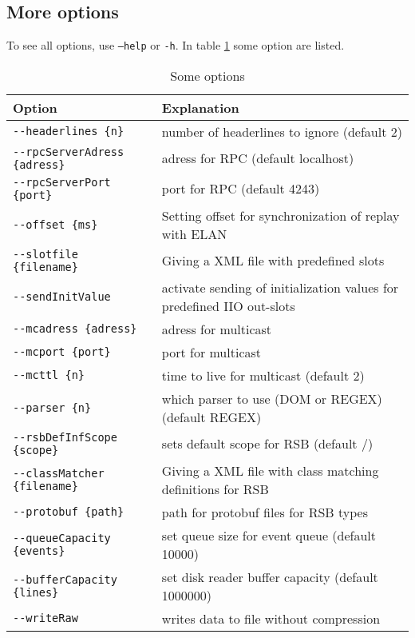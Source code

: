 \documentclass[german,a4paper]{article}
\begin{document}
\subsection{More options}
To see all options, use \texttt{--help} or \texttt{-h}. In table \ref{tab_someopt} some option are listed.\\

\begin{table}[htbp]
\centering
\begin{tabular}{ll}
Option       &  Explanation\\
\hline
\texttt{-\--headerlines \{n\}} & number of headerlines to ignore (default 2)\\
\texttt{-\--rpcServerAdress \{adress\}} & adress for RPC (default localhost)\\
\texttt{-\--rpcServerPort \{port\}} & port for RPC (default 4243)\\
\texttt{-\--offset \{ms\}}  & Setting offset for synchronization of replay with ELAN  \\
\texttt{-\--slotfile \{filename\}} & Giving a XML file with predefined slots\\
\texttt{-\--sendInitValue}  & activate sending of initialization values for predefined IIO out-slots  \\
\texttt{-\--mcadress \{adress\}} & adress for multicast \\
\texttt{-\--mcport \{port\}} & port for multicast \\
\texttt{-\--mcttl \{n\}} & time to live for multicast (default 2)\\
\texttt{-\--parser \{n\}} & which parser to use (DOM or REGEX) (default REGEX)\\
\texttt{-\--rsbDefInfScope \{scope\}} & sets default scope for RSB (default /)\\
\texttt{-\--classMatcher \{filename\}} & Giving a XML file with class matching definitions for RSB\\
\texttt{-\--protobuf \{path\}} & path for protobuf files for RSB types\\
\texttt{-\--queueCapacity \{events\}} & set queue size for event queue (default 10000)\\
\texttt{-\--bufferCapacity \{lines\}} & set disk reader buffer capacity (default 1000000)\\
\texttt{-\--writeRaw} & writes data to file without compression\\
\end{tabular}
\caption{Some options}
\label{tab_someopt}
\end{table} 
\end{document}
